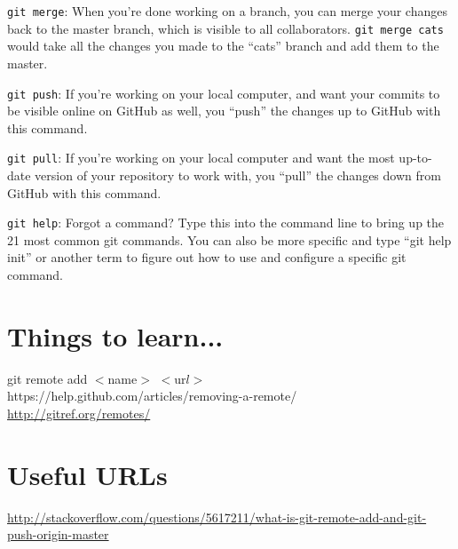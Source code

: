 \documentclass[11pt,a4paper]{article}
\begin{document}
{\tt git merge}: When you’re done working on a branch, you can merge
your changes back to the master branch, which is visible to all
collaborators. {\tt git merge cats} would take all the changes you
made to the ``cats'' branch and add them to the master.

{\tt git push}: If you’re working on your local computer, and want
your commits to be visible online on GitHub as well, you ``push'' the
changes up to GitHub with this command.

{\tt git pull}: If you’re working on your local computer and want the
most up-to-date version of your repository to work with, you ``pull''
the changes down from GitHub with this command.

{\tt git help}: Forgot a command? Type this into the command line to
bring up the 21 most common git commands. You can also be more
specific and type ``git help init'' or another term to figure out how
to use and configure a specific git command.



































\section{Things to learn...}
git remote add $<$name$>$ $<$ur$l>$\\

\noindent
https://help.github.com/articles/removing-a-remote/ \\

\noindent
\href{http://gitref.org/remotes/}{http://gitref.org/remotes/}\\


\section{Useful URLs}
\noindent
\href{http://stackoverflow.com/questions/5617211/what-is-git-remote-add-and-git-push-origin-master}{http://stackoverflow.com/questions/5617211/what-is-git-remote-add-and-git-push-origin-master}
\end{document}
